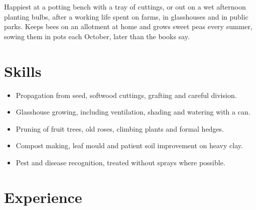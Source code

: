 \documentclass[11pt,a4paper,sans]{moderncv}
\begin{document}
\makecvtitle

\vspace{6pt}
\small{Happiest at a potting bench with a tray of cuttings, or out on a wet afternoon planting bulbs, after a working life spent on farms, in glasshouses and in public parks. Keeps bees on an allotment at home and grows sweet peas every summer, sowing them in pots each October, later than the books say.}

\section{Skills}
\vspace{1pt}
{\small
\begin{itemize}
    \item Propagation from seed, softwood cuttings, grafting and careful division.
    \item Glasshouse growing, including ventilation, shading and watering with a can.
    \item Pruning of fruit trees, old roses, climbing plants and formal hedges.
    \item Compost making, leaf mould and patient soil improvement on heavy clay.
    \item Pest and disease recognition, treated without sprays where possible.
\end{itemize}\par}
\addvspace{.5em}

\section{Experience}
\vspace{3pt}
\end{document}
